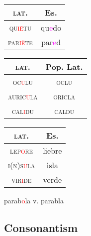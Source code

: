 \documentclass{report}
\begin{document}
\begin{tcolorbox}[title=Loss of Hiatus]

\end{tcolorbox}

\begin{tabular}{c c}
  \textsc{lat.} & Es. \\
  \hline
  \textsc{qu\textcolor{red}{i\={e}}tu} & qu\textcolor{magenta}{e}do \\
  \textsc{par\textcolor{red}{i\u{e}}te} & par\textcolor{magenta}{e}d \\
\end{tabular}

\begin{tcolorbox}[title=Syncope]
  
\end{tcolorbox}

\begin{tabular}{c c}
  \textsc{lat.} & Pop. Lat. \\
  \hline
  \textsc{oc\textcolor{red}{u}lu} & \textsc{oclu} \\
  \textsc{auric\textcolor{red}{u}la} & \textsc{oricla} \\
  \textsc{cal\textcolor{red}{i}du} & \textsc{caldu} \\
\end{tabular}

\begin{tabular}{c c}
  \textsc{lat.} & Es. \\
  \hline
  \textsc{lep\textcolor{red}{o}re} & liebre \\
  \textsc{i(n)s\textcolor{red}{u}la} & isla \\
  \textsc{vir\textcolor{red}{i}de} & verde \\
\end{tabular}

parab\textcolor{red}{o}la v. parabla \\

\begin{tcolorbox}[title=Apocope]

\end{tcolorbox}

\subsection{Consonantism}
\end{document}
